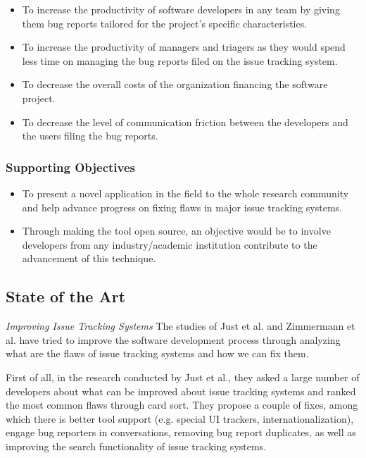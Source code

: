 \documentclass[11pt,english,twocolumn]{article}
\begin{document}
\begin{itemize}
	\item To increase the productivity of software developers in any team
	by giving them bug reports tailored for the project's specific characteristics.
	\item To increase the productivity of managers and triagers as they would
	spend less time on managing the bug reports filed on the issue tracking system.
	\item To decrease the overall costs of the organization financing the software project.
	\item To decrease the level of communication friction between the developers
	and the users filing the bug reports.
\end{itemize}

\subsubsection*{Supporting Objectives}

\begin{itemize}
	\item To present a novel application in the field to the whole research community
	and help advance progress on fixing flaws in major issue tracking systems.
	\item Through making the tool open source, an objective would be to involve
	developers from any industry/academic institution contribute to the advancement of
	this technique.
\end{itemize}

\subsection*{State of the Art}

\emph{Improving Issue Tracking Systems}  The studies of Just et al. \cite{just2008towards} 
and Zimmermann et al. \cite{zimmermann2009improving} have tried to improve the software development
process through analyzing what are the flaws of issue tracking systems and how we can
fix them.

First of all, in the research conducted by Just et al., they asked a large number of
developers about what can be improved about issue tracking systems and ranked the most common
flaws through card sort. They propose a couple of fixes, among which there is better tool support
(e.g. special UI trackers, internationalization),
engage bug reporters in conversations, removing bug report duplicates, as well as improving the
search functionality of issue tracking systems. 
\end{document}
